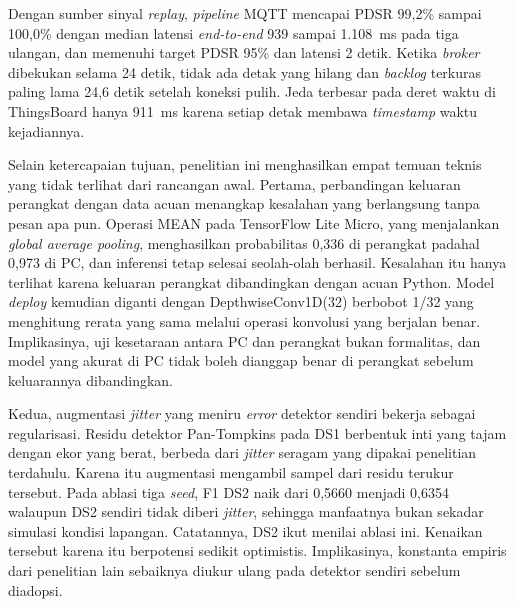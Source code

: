 Dengan sumber sinyal \textit{replay}, \textit{pipeline} MQTT mencapai PDSR 99,2\% sampai 100,0\% dengan median latensi \textit{end-to-end} 939 sampai 1.108~ms pada tiga ulangan, dan memenuhi target PDSR 95\% dan latensi 2 detik. Ketika \textit{broker} dibekukan selama 24 detik, tidak ada detak yang hilang dan \textit{backlog} terkuras paling lama 24,6 detik setelah koneksi pulih. Jeda terbesar pada deret waktu di ThingsBoard hanya 911~ms karena setiap detak membawa \textit{timestamp} waktu kejadiannya.

Selain ketercapaian tujuan, penelitian ini menghasilkan empat temuan teknis yang tidak terlihat dari rancangan awal.
Pertama, perbandingan keluaran perangkat dengan data acuan menangkap kesalahan yang berlangsung tanpa pesan apa pun. Operasi MEAN pada TensorFlow Lite Micro, yang menjalankan \textit{global average pooling}, menghasilkan probabilitas 0,336 di perangkat padahal 0,973 di PC, dan inferensi tetap selesai seolah-olah berhasil. Kesalahan itu hanya terlihat karena keluaran perangkat dibandingkan dengan acuan Python. Model \textit{deploy} kemudian diganti dengan DepthwiseConv1D(32) berbobot 1/32 yang menghitung rerata yang sama melalui operasi konvolusi yang berjalan benar. Implikasinya, uji kesetaraan antara PC dan perangkat bukan formalitas, dan model yang akurat di PC tidak boleh dianggap benar di perangkat sebelum keluarannya dibandingkan.

Kedua, augmentasi \textit{jitter} yang meniru \textit{error} detektor sendiri bekerja sebagai regularisasi. Residu detektor Pan-Tompkins pada DS1 berbentuk inti yang tajam dengan ekor yang berat, berbeda dari \textit{jitter} seragam yang dipakai penelitian terdahulu. Karena itu augmentasi mengambil sampel dari residu terukur tersebut. Pada ablasi tiga \textit{seed}, F1 DS2 naik dari 0,5660 menjadi 0,6354 walaupun DS2 sendiri tidak diberi \textit{jitter}, sehingga manfaatnya bukan sekadar simulasi kondisi lapangan. Catatannya, DS2 ikut menilai ablasi ini. Kenaikan tersebut karena itu berpotensi sedikit optimistis. Implikasinya, konstanta empiris dari penelitian lain sebaiknya diukur ulang pada detektor sendiri sebelum diadopsi.

